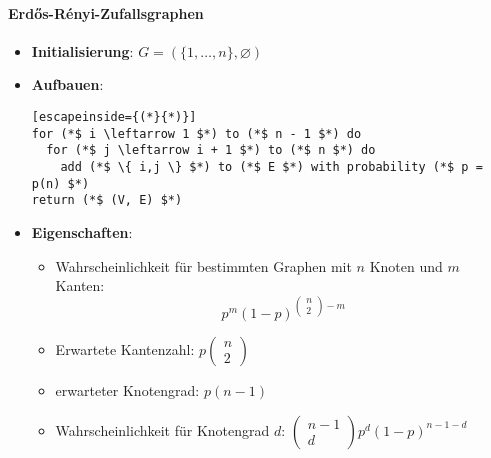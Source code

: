 \paragraph{Erd\H{o}s-Rényi-Zufallsgraphen}
\begin{itemize}
  \item \textbf{Initialisierung}: $ G = (\{ 1, \dots, n \}, \varnothing) $
  \item \textbf{Aufbauen}:
    \begin{lstlisting}[escapeinside={(*}{*)}]
for (*$ i \leftarrow 1 $*) to (*$ n - 1 $*) do
  for (*$ j \leftarrow i + 1 $*) to (*$ n $*) do
    add (*$ \{ i,j \} $*) to (*$ E $*) with probability (*$ p = p(n) $*)
return (*$ (V, E) $*)
  \end{lstlisting}
  \item \textbf{Eigenschaften}:
  \begin{itemize}
    \item Wahrscheinlichkeit für bestimmten Graphen mit $ n $ Knoten und $ m $ Kanten:
    \begin{equation*}
      p^m(1-p)^{\left( \begin{smallmatrix}
        n \\ 2
      \end{smallmatrix} \right)-m}
    \end{equation*}
    \item Erwartete Kantenzahl: $ p\left( \begin{smallmatrix}
      n \\ 2
    \end{smallmatrix} \right) $
    \item erwarteter Knotengrad: $ p(n-1) $
    \item Wahrscheinlichkeit für Knotengrad $ d $: $ \left( \begin{smallmatrix}
      n-1 \\ d
    \end{smallmatrix} \right)p^d(1-p)^{n-1-d} $
  \end{itemize}
\end{itemize}